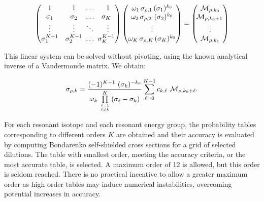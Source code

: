 \begin{equation}
\left(\begin{matrix} 1 & 1 & \hspace{-0.5em}\ldots & 1 \cr
         \sigma_1 & \sigma_2 & \hspace{-0.5em}\ldots &
         \hspace{-0.5em}\sigma_K \cr
         \vdots   & \vdots   & \hspace{-0.5em}\ddots &
         \vdots \cr
         \sigma_1^{K-1} & \sigma_2^{K-1} & \hspace{-0.5em}\ldots
         & \hspace{-0.5em}\sigma_K^{K-1}\end{matrix}\right)
\left(\begin{matrix} \omega_1 \, \sigma_{\rho,1} \, (\sigma_1)^{k_0}\cr \omega_2
\, \sigma_{\rho,2} \ (\sigma_2)^{k_0}\cr \vdots \cr \omega_K \, \sigma_{\rho,K}
\, (\sigma_K)^{k_0}\end{matrix}\right)=
\left(\begin{matrix} {\cal M}_{\rho,k_0}\cr \hspace{-0.2em}{\cal M}_{\rho,k_0+1}
\cr \vdots \cr {\cal M}_{\rho,k_1}\end{matrix}\right)
\label{eq:eq17}
\end{equation}

\vskip 0.1cm

This linear system can be solved without pivoting, using the known analytical
inverse of a Vandermonde matrix. We obtain:

\begin{equation}
\sigma_{\rho,k}={(-1)^{K-1} \ (\sigma_k)^{-k_0}\over \omega_k \,
\prod\limits_{\ell=1\atop \ell \neq k}^K \left( \sigma_\ell-\sigma_k\right)}
\sum_{\ell=0}^{K-1} c_{k,\ell} \ {\cal M}_{\rho,k_0+\ell} .
\label{eq:eq18}
\end{equation}

\vskip 0.1cm

For each resonant isotope and each resonant energy group, the probability
tables corresponding to different orders $K$ are obtained and their accuracy
is evaluated by computing Bondarenko self-shielded cross sections for a grid
of selected dilutions. The table with smallest order, meeting the accuracy
criteria, or the most accurate table, is selected. A maximum order of 12 is
allowed, but this order is seldom reached. There is no practical incentive
to allow a greater maximum order as high order tables may induce numerical
instabilities, overcoming potential increases in accuracy.

